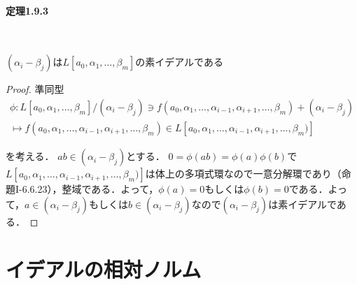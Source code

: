 \paragraph{定理1.9.3}~
\begin{screen}
  $(\alpha_i-\beta_j)$は$L[a_0, \alpha_1, \ldots, \beta_m]$の素イデアルである
\end{screen}
\begin{proof}
  準同型
  \begin{align*}
    \phi\colon L[a_0, \alpha_1, \ldots, \beta_m]/(\alpha_i-\beta_j)\ni f(a_0, \alpha_1, \ldots, \alpha_{i-1}, \alpha_{i + 1}, \ldots, \beta_m) + (\alpha_i-\beta_j) \\
    \mapsto f(a_0, \alpha_1, \ldots, \alpha_{i-1}, \alpha_{i + 1}, \ldots, \beta_m)\in L[a_0, \alpha_1, \ldots, \alpha_{i-1}, \alpha_{i + 1}, \ldots, \beta_m)]
  \end{align*}

  を考える．
  $ab\in(\alpha_i-\beta_j)$とする．
  $0 = \phi(ab) = \phi(a)\phi(b)$で$L[a_0, \alpha_1, \ldots, \alpha_{i-1}, \alpha_{i + 1}, \ldots, \beta_m)]$は体上の多項式環なので一意分解環であり（命題I-6.6.23），整域である．よって，$\phi(a) = 0$もしくは$\phi(b) = 0$である．よって，$a\in(\alpha_i-\beta_j)$もしくは$b\in(\alpha_i-\beta_j)$なので$(\alpha_i-\beta_j)$は素イデアルである．
\end{proof}

\section{イデアルの相対ノルム}
